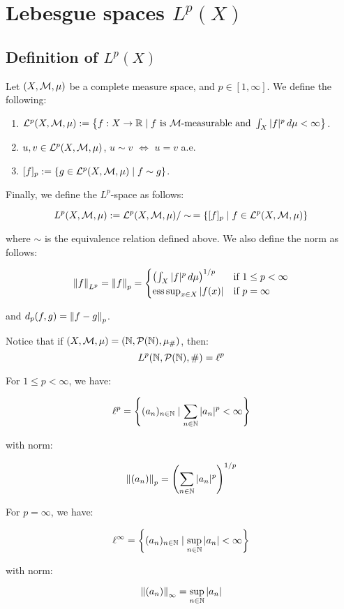 \chapter{Lebesgue spaces $L^p(X)$}

\section{Definition of $L^p(X)$}

\begin{fdefinition}
    Let $(X, \mathcal{M}, \mu)$ be a complete measure space, and $p \in [1, \infty]$.
    We define the following:
    \vspace{1em}
    \begin{enumerate}
        \item $\mathcal{L}^p(X, \mathcal{M}, \mu) := \left\{ f: X \to \mathbb{R} \mid f \text{ is } \mathcal{M}\text{-measurable and } \int_X |f|^p \, d\mu < \infty \right\}$.
        \vspace{1em}
        \item $u, v \in \mathcal{L}^p(X, \mathcal{M}, \mu)$, $u \sim v$ $\iff$ $u = v$ a.e.
        \vspace{1em}
        \item $[f]_p := \left\{ g \in \mathcal{L}^p(X, \mathcal{M}, \mu) \mid f \sim g \right\}$.
    \end{enumerate}
    \vspace{1em}
    Finally, we define the $L^p$-space as follows:

    $$L^p(X, \mathcal{M}, \mu) := \mathcal{L}^p(X, \mathcal{M}, \mu) / \sim \, = \left\{ [f]_p \mid f \in \mathcal{L}^p(X, \mathcal{M}, \mu) \right\}$$

    where $\sim$ is the equivalence relation defined above. We also define
    the norm as follows:

    $$\left\|f\right\|_{L^p} = \left\|f\right\|_p = \begin{cases}
        \left( \int_X |f|^p \, d\mu \right)^{1/p} & \text{if } 1 \leq p < \infty \\
        \operatorname{ess\,sup}_{x \in X} |f(x)| & \text{if } p = \infty
    \end{cases}$$

    and $d_p(f, g) = \left\|f - g\right\|_p$.
\end{fdefinition}

\begin{fexample}
    Notice that if $(X, \mathcal{M}, \mu) = (\mathbb{N}, \mathcal{P}(\mathbb{N}), \mu_{\#})$, then:
    $$L^p(\mathbb{N}, \mathcal{P}(\mathbb{N}), \#) = \ell^p$$

    For $1 \leq p < \infty$, we have:

    $$\ell^p = \left\{ (a_n)_{n \in \mathbb{N}} \mid \sum_{n \in \mathbb{N}} |a_n|^p < \infty \right\}$$

    with norm:

    $$\left\|(a_n)\right\|_p = \left( \sum_{n \in \mathbb{N}} |a_n|^p \right)^{1/p}$$

    For $p = \infty$, we have:

    $$\ell^{\infty} = \left\{ (a_n)_{n \in \mathbb{N}} \mid \sup_{n \in \mathbb{N}} |a_n| < \infty \right\}$$

    with norm:

    $$\left\|(a_n)\right\|_{\infty} = \sup_{n \in \mathbb{N}} |a_n|$$
\end{fexample}

